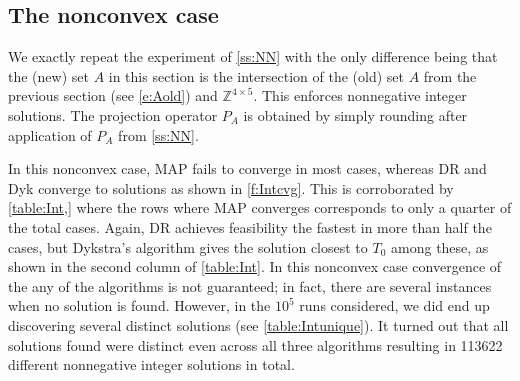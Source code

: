 \documentclass[12pt]{article}
\newcommand{\kkk}{\ensuremath{{k\in{\mathbb N}}}}
\theoremstyle{definition}
\DeclarePairedDelimiter{\lVerts}{\lVert}{\rVert}
\newcommand{\norm}[1]{\ensuremath{\lVerts*{#1}}}
\begin{document}
{%




\subsection{The nonconvex case} 
\label{subsec:Int}



We exactly repeat the experiment of \cref{ss:NN} with 
the only difference being that the (new) set $A$ in this 
section is the intersection of the 
(old) set $A$ from the previous section (see \cref{e:Aold}) 
and $\mathbb{Z}^{4\times 5}$. This enforces nonnegative 
integer solutions. The projection operator $P_A$ is obtained 
by simply rounding after application of $P_A$ from \cref{ss:NN}.


In this nonconvex case, MAP fails to converge in most cases, 
whereas DR and Dyk converge to solutions as shown in \cref{f:Intcvg}. 
This is corroborated by \cref{table:Int,} where the rows where MAP converges corresponds to 
only a quarter of the total cases.
Again, DR achieves feasibility the fastest in more than half the cases, 
but Dykstra's algorithm gives the  {solution closest to $T_0$ among these,
as shown in the second column of \cref{table:Int}.} 
In this nonconvex case convergence of the any of the algorithms
is not guaranteed; in fact, 
there are several instances when no solution is found. 
However, in the $10^5$ runs considered, 
we did end up discovering several distinct solutions (see \cref{table:Intunique}). 
It turned out that all solutions found were distinct even 
across all three algorithms resulting in 
113622 different nonnegative integer solutions in total. 


}
\end{document}
